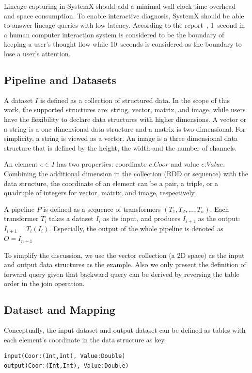 \documentclass{sig-alternate}
\begin{document}
Lineage capturing in SystemX should add a minimal wall clock time overhead and space consumption.
To enable interactive diagnosis, SystemX should be able to answer lineage queries with low latency.
According to the report~\cite{nielsen2009}, 
1~second in a human computer interaction system is considered to be the boundary of keeping a user's thought flow while 
10~seconds is considered as the boundary to lose a user's attention.

\subsection{Pipeline and Datasets}
\label{sec:Map-Pipe-Data}
A dataset $I$ is defined as a collection of structured data. In the scope of this work, the supported structures are: 
string, vector, matrix, and image, while users have the flexibility to declare data structures with higher dimensions.
A vector or a string is a one dimensional data structure and a matrix is two dimensional. 
For simplicity, a string is viewed as a vector.
An image is a three dimensional data structure that is defined by the height, the width and the number
of channels. 

An element $e \in I$ has two properties: coordinate $e.Coor$ and value $e.Value$. 
Combining the additional dimension in the collection (RDD or sequence) with the data structure, 
the coordinate of an element can be a pair, a triple, or a quadruple of integers
for vector, matrix, and image, respectively.

A pipeline $P$ is defined as a sequence of transformers $(T_1, T_2, ..., T_n)$. 
Each transformer $T_i$ takes a dataset $I_i$ as its input, and produces $I_{i+1}$ as the output: 
$I_{i+1} = T_i(I_i)$. 
Especially, the output of the whole pipeline is denoted as $O = I_{n+1}$

To simplify the discussion, we use the vector collection (a 2D space) as the input and output data structures as the example.
Also we only present the definition of forward query given that 
backward query can be derived by reversing the table order in the join operation.

\subsection{Dataset and Mapping}
\label{sec:formal-ds-mapping}
Conceptually, the input dataset and output dataset can be defined
as tables with each element's coordinate in the data structure as key.
\begin{lstlisting}
input(Coor:(Int,Int), Value:Double)
output(Coor:(Int,Int), Value:Double)
\end{lstlisting}
\end{document}
